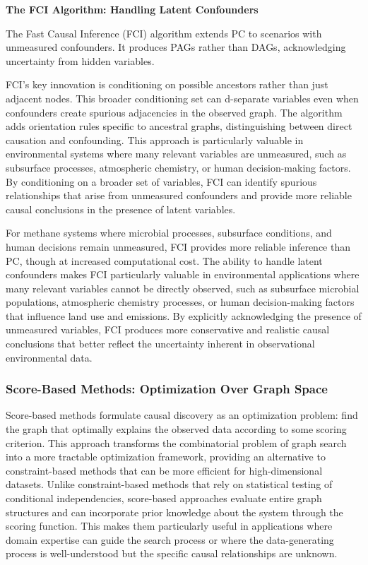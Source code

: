 \textbf{The FCI Algorithm: Handling Latent Confounders}

The Fast Causal Inference (FCI) algorithm extends PC to scenarios with unmeasured confounders. It produces PAGs rather than DAGs, acknowledging uncertainty from hidden variables.

FCI's key innovation is conditioning on possible ancestors rather than just adjacent nodes. This broader conditioning set can d-separate variables even when confounders create spurious adjacencies in the observed graph. The algorithm adds orientation rules specific to ancestral graphs, distinguishing between direct causation and confounding. This approach is particularly valuable in environmental systems where many relevant variables are unmeasured, such as subsurface processes, atmospheric chemistry, or human decision-making factors. By conditioning on a broader set of variables, FCI can identify spurious relationships that arise from unmeasured confounders and provide more reliable causal conclusions in the presence of latent variables.

For methane systems where microbial processes, subsurface conditions, and human decisions remain unmeasured, FCI provides more reliable inference than PC, though at increased computational cost. The ability to handle latent confounders makes FCI particularly valuable in environmental applications where many relevant variables cannot be directly observed, such as subsurface microbial populations, atmospheric chemistry processes, or human decision-making factors that influence land use and emissions. By explicitly acknowledging the presence of unmeasured variables, FCI produces more conservative and realistic causal conclusions that better reflect the uncertainty inherent in observational environmental data.

\subsubsection{Score-Based Methods: Optimization Over Graph Space}

Score-based methods formulate causal discovery as an optimization problem: find the graph that optimally explains the observed data according to some scoring criterion. This approach transforms the combinatorial problem of graph search into a more tractable optimization framework, providing an alternative to constraint-based methods that can be more efficient for high-dimensional datasets. Unlike constraint-based methods that rely on statistical testing of conditional independencies, score-based approaches evaluate entire graph structures and can incorporate prior knowledge about the system through the scoring function. This makes them particularly useful in applications where domain expertise can guide the search process or where the data-generating process is well-understood but the specific causal relationships are unknown.

